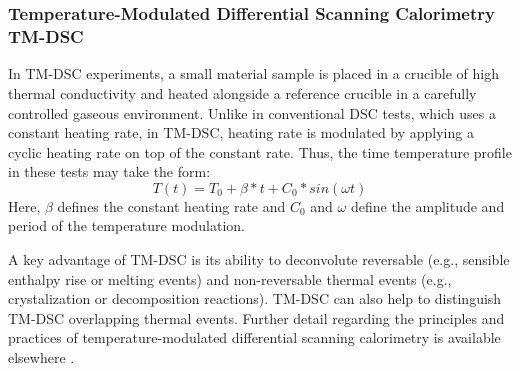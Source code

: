 \documentclass{book}
\begin{document}
\begin{table}[ht]
	\caption{Test Matrix of DSC Tests Conducted in Pure Nitrogen; table values indicate number of tests conducted under listed test conditions}
	\label{Table:Matrix_DSC_N2}
	\begin{center}
		\\
	\end{center}
\end{table}

\begin{table}[ht]
    \caption{Test Matrix of DSC Tests Conducted in Oxygen-Nitrogen Atmospheres; table values indicate number of tests conducted under listed test conditions}
    \label{Table:Matrix_DSC_O2}
    \begin{center}
        \\
    \end{center}
\end{table}



\subsubsection*{Temperature-Modulated Differential Scanning Calorimetry TM-DSC}
In TM-DSC experiments, a small material sample is placed in a crucible of high thermal conductivity and heated alongside a reference crucible in a carefully controlled gaseous environment. Unlike in conventional DSC tests, which uses a constant heating rate, in TM-DSC, heating rate is modulated by applying a cyclic heating rate on top of the constant rate. Thus, the time temperature profile in these tests may take the form:
\begin{equation}
T(t)=T_0+\beta*t + C_0*sin(\omega t)
\end{equation}
Here, $\beta$ defines the constant heating rate and $C_0$ and $\omega$ define the amplitude and period of the temperature modulation.

A key advantage of TM-DSC is its ability to deconvolute reversable (e.g., sensible enthalpy rise or melting events) and non-reversable thermal events (e.g., crystalization or decomposition reactions).  TM-DSC can also help to distinguish TM-DSC overlapping thermal events. Further detail regarding the principles and practices of temperature-modulated differential scanning calorimetry is available elsewhere \cite{mcnaughton2003differential, leng2013materials}.
\end{document}
